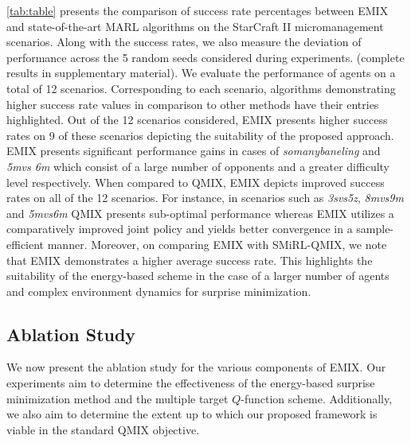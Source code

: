 \documentclass{article}
\begin{document}
\begin{multicols}{2}
\autoref{tab:table} presents the comparison of success rate percentages between EMIX and state-of-the-art MARL algorithms on the StarCraft II micromanagement scenarios. Along with the success rates, we also measure the deviation of performance across the 5 random seeds considered during experiments. (complete results in supplementary material). We evaluate the performance of agents on a total of 12 scenarios. Corresponding to each scenario, algorithms demonstrating higher success rate values in comparison to other methods have their entries highlighted. Out of the 12 scenarios considered, EMIX presents higher success rates on 9 of these scenarios depicting the suitability of the proposed approach. EMIX presents significant performance gains in cases of \textit{so\textunderscore many\textunderscore baneling} and \textit{5m\textunderscore vs \textunderscore 6m} which consist of a large number of opponents and a greater difficulty level respectively. When compared to QMIX, EMIX depicts improved success rates on all of the 12 scenarios. For instance, in scenarios such as \textit{3s\textunderscore vs\textunderscore 5z}, \textit{8m\textunderscore vs\textunderscore 9m} and \textit{5m\textunderscore vs\textunderscore 6m} QMIX presents sub-optimal performance whereas EMIX utilizes a comparatively improved joint policy and yields better convergence in a sample-efficient manner. Moreover, on comparing EMIX with SMiRL-QMIX, we note that EMIX demonstrates a higher average success rate. This highlights the suitability of the energy-based scheme in the case of a larger number of agents and complex environment dynamics for surprise minimization.

\subsection{Ablation Study}
We now present the ablation study for the various components of EMIX. Our experiments aim to determine the effectiveness of the energy-based surprise minimization method and the multiple target $Q$-function scheme. Additionally, we also aim to determine the extent up to which our proposed framework is viable in the standard QMIX objective.


\end{multicols}
\end{document}
